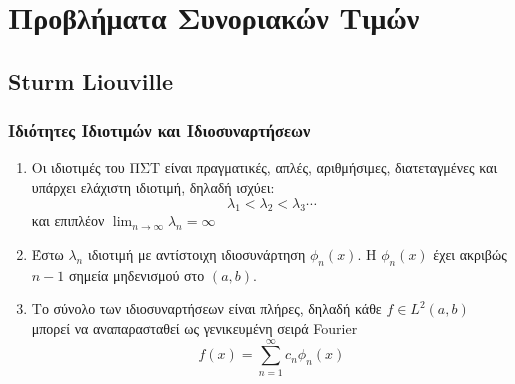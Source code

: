 



\geometry{top=1cm}

\pagestyle{vangelis}
\everymath{\displaystyle}
\setcounter{chapter}{1}



\chapter*{Προβλήματα Συνοριακών Τιμών}

\section*{Sturm Liouville}

\subsection*{Ιδιότητες Ιδιοτιμών και Ιδιοσυναρτήσεων}

\begin{enumerate}
  \item Οι ιδιοτιμές του ΠΣΤ είναι πραγματικές, απλές, αριθμήσιμες, διατεταγμένες και 
    υπάρχει ελάχιστη ιδιοτιμή, δηλαδή ισχύει:
    \[
      \lambda _{1} < \lambda _{2} < \lambda _{3} \cdots 
     \]
     και επιπλέον $ \lim_{n \to \infty} \lambda _{n} = \infty $

   \item Έστω $ \lambda _{n} $ ιδιοτιμή με αντίστοιχη ιδιοσυνάρτηση $ \phi _{n}(x) $. 
     Η $ \phi _{n}(x) $ έχει ακριβώς $ n-1 $ σημεία μηδενισμού στο $ (a,b) $.

   \item Το σύνολο των ιδιοσυναρτήσεων είναι πλήρες, δηλαδή κάθε $ f \in L^{2}(a,b) $ 
     μπορεί να αναπαρασταθεί ως γενικευμένη σειρά Fourier 
     \[
       f(x) = \sum_{n=1}^{\infty} c_{n} \phi _{n}(x) 
      \] 


     
\end{enumerate}



